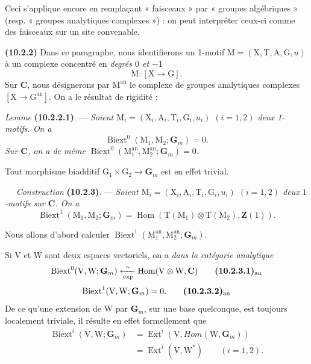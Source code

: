 \documentclass[11pt,leqno]{article}
\newcommand{\Page}[1]{\ifvmode\noindent\else\unskip\ \fi{\footnotesize\textcolor{gray}{[p.\,#1]}}\ \ignorespaces}
\begin{document}
Ceci s’applique encore en remplaçant « faisceaux » par « groupes
algébriques » (resp. « groupes analytiques complexes ») : on peut
interpréter ceux-ci comme des faisceaux sur un site convenable.

\textbf{(10.2.2)} Dans ce paragraphe, nous identifierons un 1-motif
\(\mathrm{M}=(\mathrm{X},\mathrm{T},\mathrm{A},\mathrm{G},u)\)
à un complexe concentré en \textit{degrés \(0\) et \(-1\)}
\[
\mathrm{M}:[\mathrm{X}\to\mathrm{G}].
\]
Sur \(\mathbf{C}\), nous désignerons par \(\mathrm{M}^{\mathrm{an}}\)
le complexe de groupes analytiques complexes
\([\mathrm{X}\to\mathrm{G}^{\mathrm{an}}]\).
On a le résultat de rigidité :

\textit{Lemme} \textbf{(10.2.2.1)}. —
\textit{Soient
\(\mathrm{M}_i=(\mathrm{X}_i,\mathrm{A}_i,\mathrm{T}_i,\mathrm{G}_i,u_i)\)
\((i=1,2)\) deux 1-motifs. On a}
\[
\operatorname{Biext}^0(\mathrm{M}_1,\mathrm{M}_2;\mathbf{G}_m)=0.
\]
\textit{Sur \(\mathbf{C}\), on a de même
\(\operatorname{Biext}^0
(\mathrm{M}_1^{\mathrm{an}},\mathrm{M}_2^{\mathrm{an}};\mathbf{G}_m)=0\).}

Tout morphisme biadditif
\(\mathrm{G}_1\times\mathrm{G}_2\to\mathbf{G}_m\)
est en effet trivial.

\Page{61}
\textit{Construction} \textbf{(10.2.3)}. — \textit{Soient
\(\mathrm{M}_i=(\mathrm{X}_i,\mathrm{A}_i,\mathrm{T}_i,\mathrm{G}_i,u_i)\)
\((i=1,2)\) deux \(1\)-motifs sur \(\mathbf{C}\). On a}
\[
\operatorname{Biext}^{1}(\mathrm{M}_1,\mathrm{M}_2;\mathbf{G}_m)
=\operatorname{Hom}(\mathrm{T}(\mathrm{M}_1)\otimes
\mathrm{T}(\mathrm{M}_2),\mathbf{Z}(1)).
\]

Nous allons d’abord calculer
\(\operatorname{Biext}^{1}(\mathrm{M}_1^{\mathrm{an}},
\mathrm{M}_2^{\mathrm{an}};\mathbf{G}_m)\).

Si \(\mathrm{V}\) et \(\mathrm{W}\) sont deux espaces vectoriels, on a
\textit{dans la catégorie analytique}
\[
\operatorname{Biext}^{0}(\mathrm{V},\mathrm{W};\mathbf{G}_m)
\xleftarrow[\exp]{\sim}
\operatorname{Hom}(\mathrm{V}\otimes\mathrm{W},\mathbf{C})
\tag*{\textbf{(10.2.3.1)}\textsubscript{an}}
\]
\[
\operatorname{Biext}^{1}(\mathrm{V},\mathrm{W};\mathbf{G}_m)=0.
\tag*{\textbf{(10.2.3.2)}\textsubscript{an}}
\]
De ce qu’une extension de \(\mathrm{W}\) par \(\mathbf{G}_m\), sur une base
quelconque, est toujours localement triviale, il résulte en effet
formellement que
\[
\begin{aligned}
\operatorname{Biext}^{i}(\mathrm{V},\mathrm{W};\mathbf{G}_m)
&=\operatorname{Ext}^{i}(\mathrm{V},
  \mathit{Hom}(\mathrm{W},\mathbf{G}_m))\\
&=\operatorname{Ext}^{i}(\mathrm{V},\mathrm{W}^{*})
\qquad(i=1,2).
\end{aligned}
\]
\end{document}
